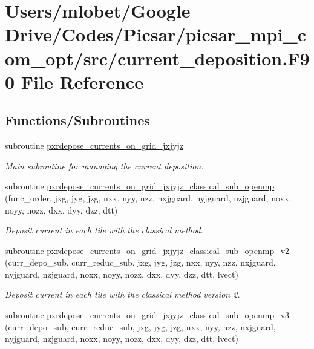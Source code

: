 \hypertarget{current__deposition_8_f90}{}\section{Users/mlobet/\+Google Drive/\+Codes/\+Picsar/picsar\+\_\+mpi\+\_\+com\+\_\+opt/src/current\+\_\+deposition.F90 File Reference}
\label{current__deposition_8_f90}
\subsection*{Functions/\+Subroutines}
\begin{DoxyCompactItemize}
\item 
subroutine \hyperlink{current__deposition_8_f90_af9162fd522e5d0fe559fc65848991ee3}{pxrdepose\+\_\+currents\+\_\+on\+\_\+grid\+\_\+jxjyjz}
\begin{DoxyCompactList}\small\item\em Main subroutine for managing the current deposition. \end{DoxyCompactList}\item 
subroutine \hyperlink{current__deposition_8_f90_a3a0c5fb2e4682380dda0f71bcbf132d4}{pxrdepose\+\_\+currents\+\_\+on\+\_\+grid\+\_\+jxjyjz\+\_\+classical\+\_\+sub\+\_\+openmp} (func\+\_\+order, jxg, jyg, jzg, nxx, nyy, nzz, nxjguard, nyjguard, nzjguard, noxx, noyy, nozz, dxx, dyy, dzz, dtt)
\begin{DoxyCompactList}\small\item\em Deposit current in each tile with the classical method. \end{DoxyCompactList}\item 
subroutine \hyperlink{current__deposition_8_f90_a2624df4633b361373555666b08c92ca1}{pxrdepose\+\_\+currents\+\_\+on\+\_\+grid\+\_\+jxjyjz\+\_\+classical\+\_\+sub\+\_\+openmp\+\_\+v2} (curr\+\_\+depo\+\_\+sub, curr\+\_\+reduc\+\_\+sub, jxg, jyg, jzg, nxx, nyy, nzz, nxjguard, nyjguard, nzjguard, noxx, noyy, nozz, dxx, dyy, dzz, dtt, lvect)
\begin{DoxyCompactList}\small\item\em Deposit current in each tile with the classical method version 2. \end{DoxyCompactList}\item 
subroutine \hyperlink{current__deposition_8_f90_a05b540593f69d201b9ac6e74b0fea593}{pxrdepose\+\_\+currents\+\_\+on\+\_\+grid\+\_\+jxjyjz\+\_\+classical\+\_\+sub\+\_\+openmp\+\_\+v3} (curr\+\_\+depo\+\_\+sub, curr\+\_\+reduc\+\_\+sub, jxg, jyg, jzg, nxx, nyy, nzz, nxjguard, nyjguard, nzjguard, noxx, noyy, nozz, dxx, dyy, dzz, dtt, lvect)

\end{DoxyCompactItemize}
